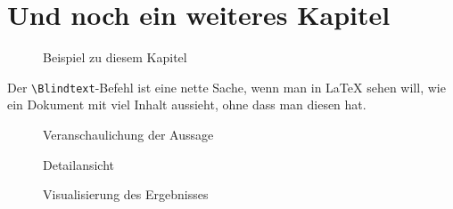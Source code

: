 

\chapter{Und noch ein weiteres Kapitel}

\begin{figure}[h]
  \centering
  \caption{Beispiel zu diesem Kapitel}
  \label{picture - example}
\end{figure}

\Blindtext Der \verb$\Blindtext$-Befehl ist eine nette Sache, wenn man in \LaTeX{} sehen will, wie ein Dokument mit viel Inhalt aussieht, ohne dass man diesen hat.

\begin{figure}[p]
  \centering
  \caption{Veranschaulichung der Aussage}
  \label{picture - illustration}
\end{figure}

\begin{figure}[p]
  \centering
  \caption{Detailansicht}
  \label{picture - detail}
\end{figure}

\begin{figure}[p]
  \centering
  \caption{Visualisierung des Ergebnisses}
  \label{picture - visualization}
\end{figure}
